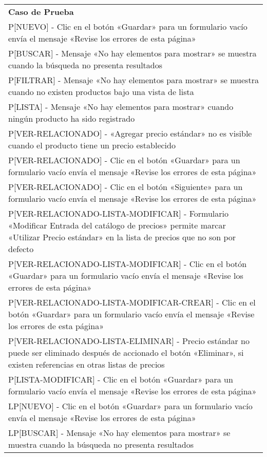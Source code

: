 \begin{longtable}{|p{15.0cm}|}
\hline
\textbf{Caso de Prueba} \\
P[NUEVO] - Clic en el botón «Guardar» para un formulario vacío envía el mensaje «Revise los errores de esta página» \\ \hline
P[BUSCAR] - Mensaje «No hay elementos para mostrar» se muestra cuando la búsqueda no presenta resultados \\ \hline
P[FILTRAR] - Mensaje «No hay elementos para mostrar» se muestra cuando no existen productos bajo una vista de lista \\ \hline
P[LISTA] - Mensaje «No hay elementos para mostrar» cuando ningún producto ha sido registrado \\ \hline
P[VER-RELACIONADO] - «Agregar precio estándar» no es visible cuando el producto tiene un precio establecido \\ \hline
P[VER-RELACIONADO] - Clic en el botón «Guardar» para un formulario vacío envía el mensaje «Revise los errores de esta página» \\ \hline
P[VER-RELACIONADO] - Clic en el botón «Siguiente» para un formulario vacío envía el mensaje «Revise los errores de esta página» \\ \hline
P[VER-RELACIONADO-LISTA-MODIFICAR] - Formulario «Modificar Entrada del catálogo de precios» permite marcar «Utilizar Precio estándar» en la lista de precios que no son por defecto \\ \hline
P[VER-RELACIONADO-LISTA-MODIFICAR] - Clic en el botón «Guardar» para un formulario vacío envía el mensaje «Revise los errores de esta página» \\ \hline
P[VER-RELACIONADO-LISTA-MODIFICAR-CREAR] - Clic en el botón «Guardar» para un formulario vacío envía el mensaje «Revise los errores de esta página» \\ \hline
P[VER-RELACIONADO-LISTA-ELIMINAR] - Precio estándar no puede ser eliminado después de accionado el botón «Eliminar», si existen referencias en otras listas de precios \\ \hline
P[LISTA-MODIFICAR] - Clic en el botón «Guardar» para un formulario vacío envía el mensaje «Revise los errores de esta página» \\ \hline
LP[NUEVO] - Clic en el botón «Guardar» para un formulario vacío envía el mensaje «Revise los errores de esta página» \\ \hline
LP[BUSCAR] - Mensaje «No hay elementos para mostrar» se muestra cuando la búsqueda no presenta resultados \\ \hline

\end{longtable}
